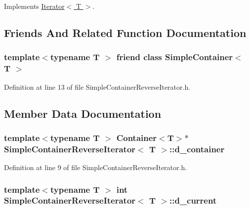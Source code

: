 Implements \hyperlink{class_iterator_a94a7b0c50676cd9ee924eddece41d8d4}{Iterator$<$ T $>$}.



\subsection{Friends And Related Function Documentation}
\hypertarget{class_simple_container_reverse_iterator_af3eda3b215741021fb668d573cf344f3}{
\subsubsection[{SimpleContainer$<$ T $>$}]{\setlength{\rightskip}{0pt plus 5cm}template$<$typename T $>$ friend class {\bf SimpleContainer}$<$ T $>$}}
\label{class_simple_container_reverse_iterator_af3eda3b215741021fb668d573cf344f3}


Definition at line 13 of file SimpleContainerReverseIterator.h.



\subsection{Member Data Documentation}
\hypertarget{class_simple_container_reverse_iterator_a12aa1a90a17b18cdba8371bfe21628ed}{
\subsubsection[{d\_\-container}]{\setlength{\rightskip}{0pt plus 5cm}template$<$typename T $>$ {\bf Container}$<$T$>$$\ast$ {\bf SimpleContainerReverseIterator}$<$ T $>$::{\bf d\_\-container}}}
\label{class_simple_container_reverse_iterator_a12aa1a90a17b18cdba8371bfe21628ed}


Definition at line 9 of file SimpleContainerReverseIterator.h.

\hypertarget{class_simple_container_reverse_iterator_a141b5cd23385f62bb912f9a41d1938a6}{
\subsubsection[{d\_\-current}]{\setlength{\rightskip}{0pt plus 5cm}template$<$typename T $>$ int {\bf SimpleContainerReverseIterator}$<$ T $>$::{\bf d\_\-current}}}
\label{class_simple_container_reverse_iterator_a141b5cd23385f62bb912f9a41d1938a6}


